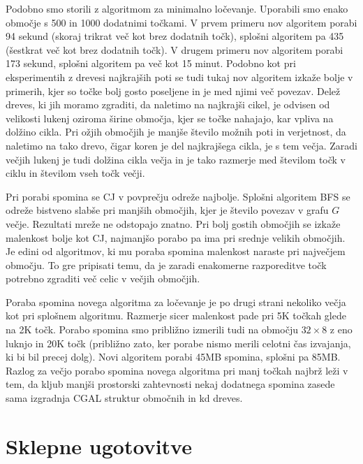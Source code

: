 \documentclass[a4paper, 12pt]{book}
\begin{document}
Podobno smo storili z algoritmom za minimalno ločevanje. Uporabili smo enako območje s 500 in 1000 dodatnimi točkami. V prvem primeru nov algoritem porabi 94 sekund (skoraj trikrat več kot brez dodatnih točk), splošni algoritem pa 435 (šestkrat več kot brez dodatnih točk). V drugem primeru nov algoritem porabi 173 sekund, splošni algoritem pa več kot 15 minut. Podobno kot pri eksperimentih z drevesi najkrajših poti se tudi tukaj nov algoritem izkaže bolje v primerih, kjer so točke bolj gosto poseljene in je med njimi več povezav. Delež dreves, ki jih moramo zgraditi, da naletimo na najkrajši cikel, je odvisen od velikosti lukenj oziroma širine območja, kjer se točke nahajajo, kar vpliva na dolžino cikla. Pri ožjih območjih je manjše število možnih poti in verjetnost, da naletimo na tako drevo, čigar koren je del najkrajšega cikla, je s tem večja. Zaradi večjih lukenj je tudi dolžina cikla večja in je tako razmerje med številom točk v ciklu in številom vseh točk večji.

Pri porabi spomina se CJ v povprečju odreže najbolje. Splošni algoritem BFS se odreže bistveno slabše pri manjših območjih, kjer je število povezav v grafu $G$ večje. Rezultati mreže ne odstopajo znatno. Pri bolj gostih območjih se izkaže malenkost bolje kot CJ, najmanjšo porabo pa ima pri srednje velikih območjih. Je edini od algoritmov, ki mu poraba spomina malenkost naraste pri največjem območju. To gre pripisati temu, da je zaradi enakomerne razporeditve točk potrebno zgraditi več celic v večjih območjih. 

Poraba spomina novega algoritma za ločevanje je po drugi strani nekoliko večja kot pri splošnem algoritmu. Razmerje sicer malenkost pade pri 5K točkah glede na 2K točk. Porabo spomina smo približno izmerili tudi na območju $32\times 8$ z eno luknjo in 20K točk (približno zato, ker porabe nismo merili celotni čas izvajanja, ki bi bil precej dolg). Novi algoritem porabi 45MB spomina, splošni pa 85MB. Razlog za večjo porabo spomina novega algoritma pri manj točkah najbrž leži v tem, da kljub manjši prostorski zahtevnosti nekaj dodatnega spomina zasede sama izgradnja CGAL struktur območnih in kd dreves. 


\chapter{Sklepne ugotovitve}
\label{ch4}
\end{document}
